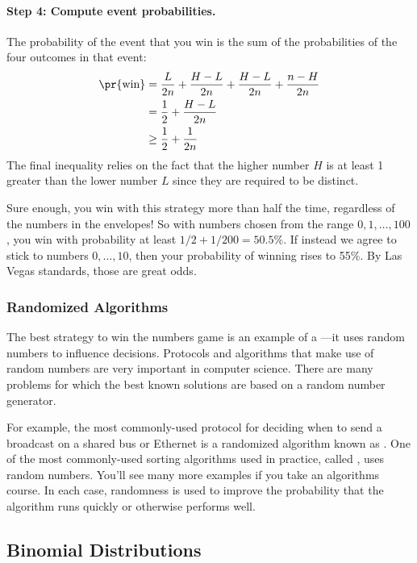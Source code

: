 \paragraph{Step 4: Compute event probabilities.}

The probability of the event that you win is the sum of the
probabilities of the four outcomes in that event:
%
\begin{align*}
\pr{\text{win}}
    & = \frac{L}{2n} + \frac{H-L}{2n} + \frac{H-L}{2n}  + \frac{n-H}{2n} \\
    & = \frac{1}{2} + \frac{H-L}{2n} \\
    & \geq \frac{1}{2} + \frac{1}{2n}
\end{align*}
%
The final inequality relies on the fact that the higher number $H$ is
at least 1 greater than the lower number $L$ since they are required
to be distinct.

Sure enough, you win with this strategy more than half the time,
regardless of the numbers in the envelopes! So with numbers chosen
from the range $0, 1, \dots, 100$, you win with probability at least
$1/2 +1/200 = 50.5\%$.  If instead we agree to stick to numbers $0,
\dots, 10$, then your probability of winning rises to 55\%.  By Las
Vegas standards, those are great odds.

\subsubsection{Randomized Algorithms}

The best strategy to win the numbers game is an example of a
---it uses random numbers to influence
decisions.  Protocols and algorithms that make use of random numbers
are very important in computer science.  There are many problems for
which the best known solutions are based on a random number generator.

For example, the most commonly-used protocol for deciding when to send
a broadcast on a shared bus or Ethernet is a randomized algorithm
known as .  One of the most commonly-used
sorting algorithms used in practice, called , uses
random numbers.  You'll see many more examples if you take an
algorithms course.  In each case, randomness is used to improve the
probability that the algorithm runs quickly or otherwise performs
well.


\subsection{Binomial Distributions}\label{binomial_distribution_section}

